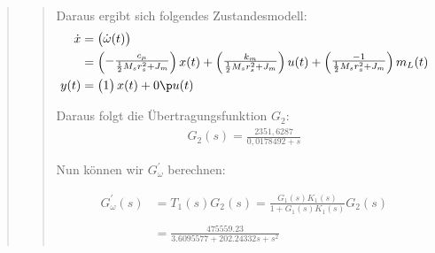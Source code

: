 \begin{quote}
\begin{quote}
        Daraus ergibt sich folgendes Zustandesmodell:
        \begin{equation*}
            \begin{split}
                   \dot{x} &=
                   \begin{pmatrix}
                        \dot{\omega}(t)\\
                   \end{pmatrix}\\ &=
                   \begin{pmatrix}
                        -\frac{c_\mu}{\frac{1}{2}M_s r^2_s + J_m}\\
                   \end{pmatrix} x(t) +
                   \begin{pmatrix}
                       \frac{k_m}{\frac{1}{2}M_sr^2_s + J_m}\\
                   \end{pmatrix} u(t) +
                   \begin{pmatrix}
                       \frac{-1}{\frac{1}{2}M_sr^2_s + J_m}\\
                   \end{pmatrix} m_L(t)\\
                   y(t) &= 
                   \begin{pmatrix}
                        1\\
                   \end{pmatrix} x(t) + 0 \p u(t)
            \end{split}
        \end{equation*}
        
        Daraus folgt die Übertragungsfunktion $G_2$:
        \begin{equation*}
        	\begin{split}
        		G_2 (s) = \frac{2351,6287}{0,0178492 + s}
        	\end{split}
        \end{equation*}
        
        Nun können wir $G_\omega^{'}$ berechnen:
	
		\begin{equation*}
        	\begin{split}
        		G_\omega^{'} (s) &= T_1(s) G_2(s) = \frac{G_1 (s) K_1(s)}{1 + G_1 (s) K_1 (s)} G_2 (s)\\ \\
        		&= \frac{475559.23}{3.6095577 + 202.24332s + s^2}
        	\end{split}
        \end{equation*}
		

\end{quote}
\end{quote}
